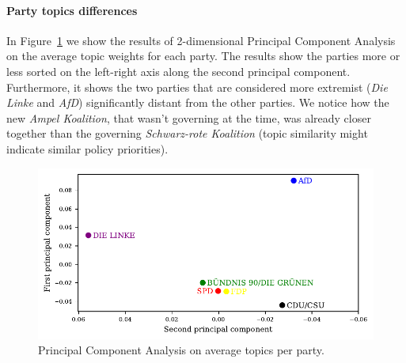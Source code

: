 \documentclass{article}
\begin{document}
\paragraph{Party topics differences}
In Figure~\ref{pca_plot} we show the results of 2-dimensional Principal Component Analysis on the average topic weights for each party.
The results show the parties more or less sorted on the left-right axis along the second principal component.
Furthermore, it shows the two parties that are considered more extremist (\textit{Die Linke} and \textit{AfD}) significantly distant from the other parties.
We notice how the new \textit{Ampel Koalition}, that wasn't governing at the time, was already closer together than the governing \textit{Schwarz-rote Koalition} (topic similarity might indicate similar policy priorities).

\begin{figure}
  \centering
  \includegraphics[width=0.9\linewidth]{images/pca.pdf}
  \captionsetup{width=0.9\linewidth}
  \caption{
    Principal Component Analysis on average topics per party.
  }
  \label{pca_plot}
\end{figure}
\end{document}
